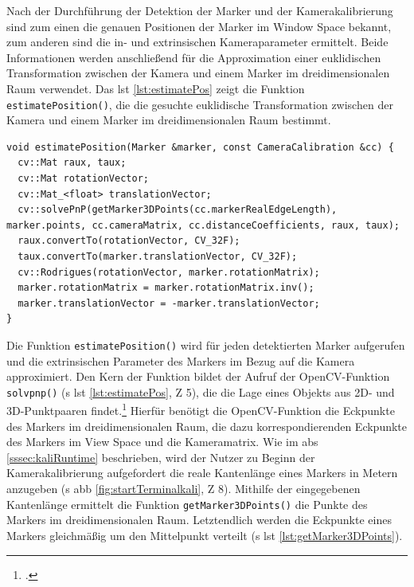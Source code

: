\noindent Nach der Durchführung der Detektion der Marker und der Kamerakalibrierung sind zum einen die genauen Positionen der Marker im Window Space bekannt, zum anderen sind die in- und extrinsischen Kameraparameter ermittelt. Beide Informationen werden anschließend für die Approximation einer euklidischen Transformation zwischen der Kamera und einem Marker im dreidimensionalen Raum verwendet. Das \acs{lst} \ref{lst:estimatePos} zeigt die Funktion \texttt{estimatePosition()}, die die gesuchte euklidische Transformation zwischen der Kamera und einem Marker im dreidimensionalen Raum bestimmt. 

\newpage

\begin{lstlisting}[caption={Die Funktion \texttt{detectormarkerbased.cpp/estimatePosition()} bestimmt die Lage eines Markers im dreidimensionalen Raum im Bezug auf die Kamera}, label={lst:estimatePos}]
void estimatePosition(Marker &marker, const CameraCalibration &cc) {
  cv::Mat raux, taux;
  cv::Mat rotationVector;
  cv::Mat_<float> translationVector;
  cv::solvePnP(getMarker3DPoints(cc.markerRealEdgeLength), marker.points, cc.cameraMatrix, cc.distanceCoefficients, raux, taux);
  raux.convertTo(rotationVector, CV_32F);
  taux.convertTo(marker.translationVector, CV_32F);
  cv::Rodrigues(rotationVector, marker.rotationMatrix);
  marker.rotationMatrix = marker.rotationMatrix.inv();
  marker.translationVector = -marker.translationVector;
}
\end{lstlisting}

\noindent Die Funktion \texttt{estimatePosition()} wird für jeden detektierten Marker aufgerufen und die extrinsischen Parameter des Markers im Bezug auf die Kamera approximiert. Den Kern der Funktion bildet der Aufruf der OpenCV-Funktion \texttt{solvpnp()} (\acs{s} \acs{lst} \ref{lst:estimatePos}, \acs{Z} 5), die die Lage eines Objekts aus 2D- und 3D-Punktpaaren findet.\footcite{opencvsolvePnP} Hierfür benötigt die OpenCV-Funktion die Eckpunkte des Markers im dreidimensionalen Raum, die dazu korrespondierenden Eckpunkte des Markers im View Space und die Kameramatrix. Wie im \acs{abs} \ref{sssec:kaliRuntime} beschrieben, wird der Nutzer zu Beginn der Kamerakalibrierung aufgefordert die reale Kantenlänge eines Markers in Metern anzugeben (\acs{s} \acs{abb} \ref{fig:startTerminalkali}, \acs{Z} 8). Mithilfe der eingegebenen Kantenlänge ermittelt die Funktion \texttt{getMarker3DPoints()} die Punkte des Markers im dreidimensionalen Raum. Letztendlich werden die Eckpunkte eines Markers gleichmäßig um den Mittelpunkt verteilt (\acs{s} \acs{lst} \ref{lst:getMarker3DPoints}).

